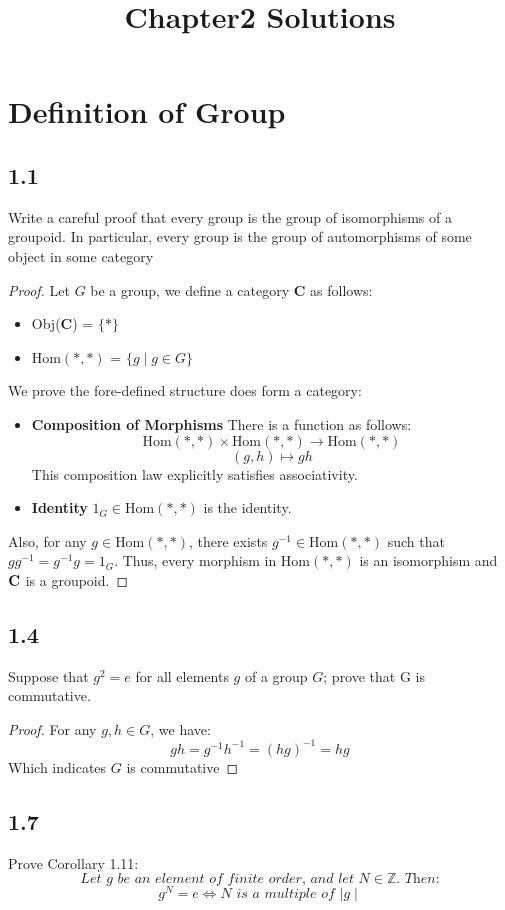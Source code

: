 \documentclass[a4paper, pdf, 12pt]{article}
\title{Chapter2 Solutions}
\newcommand{\catname}[1]{{\normalfont\textbf{#1}}}
\begin{document}
\section*{Definition of Group}
\subsection*{1.1} Write a careful proof that every group is the group of isomorphisms of a
groupoid. In particular, every group is the group of automorphisms of some object
in some category
\begin{proof}
  Let $G$ be a group, we define a category \catname{C} as follows:
  \begin{itemize}
    \item Obj(\catname{C}) = $\{*\}$
    \item Hom$(*,*)$ = $\{g \mid g \in G\}$
  \end{itemize}
  We prove the fore-defined structure does form a category:
  \begin{itemize}
    \item \textbf{Composition of Morphisms}\quad
          There is a function as follows:\\
          $$
            \mbox{Hom}(*,*) \times \mbox{Hom}(*,*) \rightarrow \mbox{Hom}(*,*)
          $$
          $$
            (g,h)\mapsto gh
          $$
          This composition law explicitly satisfies associativity.

    \item \textbf{Identity} $1_G\in \mbox{Hom}(*,*)$ is the identity.
  \end{itemize}
  Also, for any $g\in \mbox{Hom}(*,*)$, there exists $g^{-1}\in \mbox{Hom}(*,*)$ such that
  $gg^{-1} = g^{-1}g = 1_G$. Thus, every morphism in $\mbox{Hom}(*,*)$ is an isomorphism and
  $\catname{C}$ is a groupoid.
\end{proof}

\subsection*{1.4} Suppose that $g^2 = e$ for all elements $g$ of a group $G$; prove that G is commutative.
\begin{proof}
  For any $g,h\in G$, we have:
  $$
    gh = g^{-1}h^{-1} = (hg)^{-1} = hg
  $$
  Which indicates $G$ is commutative
\end{proof}

\subsection*{1.7} Prove Corollary 1.11: \\
$$
  \textit{Let $g$ be an element of finite order, and let $N\in\mathbb{Z}$. Then:}
$$
$$
  \textit{$g^{N}=e\Leftrightarrow N$ is a multiple of $\mid g\mid$}
$$
\end{document}
